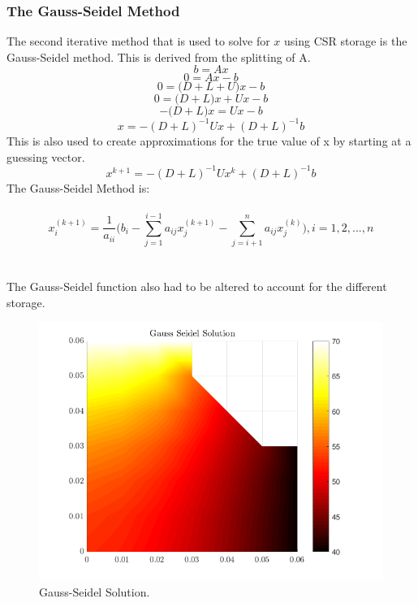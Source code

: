 \documentclass[12pt,a4paper]{article}
\begin{document}
\subsubsection{The Gauss-Seidel Method}
The second iterative method that is used to solve for $x$ using CSR storage is the Gauss-Seidel method. This is derived from the splitting of A.
\[b=Ax\]
\[0=Ax-b\]
\[0=\big(D+L+U\big)x-b\]
\[0=\big(D+L\big)x+Ux-b\]
\[-\big(D+L\big)x=Ux-b\]
\[x=-(D+L)^{-1}Ux+(D+L)^{-1}b\]
This is also used to create approximations for the true value of x by starting at a guessing vector.
\[x^{k+1}=-(D+L)^{-1}Ux^{k}+(D+L)^{-1}b\]
The Gauss-Seidel Method is:
\\\\
$$x_{i}^{(k+1)} = \frac{1}{a_{ii}}\bigg(b_i-\sum_{j=1}^{i-1}a_{ij}x_{j}^{(k+1)}-\sum_{j=i+1}^{n}a_{ij}x_{j}^{(k)}\bigg), i = 1, 2, ..., n$$
\\\\
The Gauss-Seidel function also had to be altered to account for the different storage. 

\begin{figure}[H]
	\includegraphics[width=\linewidth]{images/gaussseidelsolution.png}
	\caption{Gauss-Seidel Solution.}
	\label{fig:gauss}
\end{figure}
\end{document}
